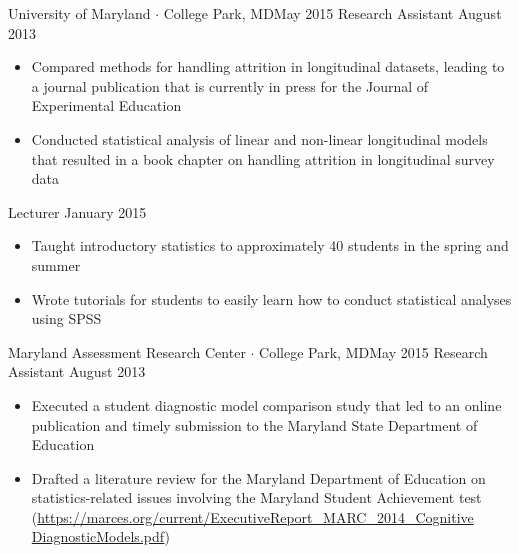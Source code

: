 \begin{experiences}
{\begin{itemize}
      \end{itemize}
                    }

   \emptySeparator
   
 \experience
    {University of Maryland $\cdot$ College Park, MD}{May 2015}
    {Research Assistant}
    {August 2013}    {
       \begin{itemize}
             \item Compared methods for handling attrition in longitudinal datasets, leading to a journal publication that is currently in press for the Journal of Experimental Education   
             
             \item Conducted statistical analysis of linear and non-linear longitudinal models that resulted in a book chapter on handling attrition in longitudinal survey data       
       \end{itemize}
                    }
  \emptySeparator  
  
  {Lecturer}
  {January 2015}{
       \begin{itemize}
             \item Taught introductory statistics to approximately 40 students in the spring and summer
             \item Wrote tutorials for students to easily learn how to conduct statistical analyses using SPSS
      \end{itemize}
  }
\emptySeparator 
 \experience
    {Maryland Assessment Research Center $\cdot$ College Park, MD}{May 2015}
    {Research Assistant}
    {August 2013}    {
       \begin{itemize}
             \item Executed a student diagnostic model comparison study that led to an online publication and timely submission to the Maryland State Department of Education %
             \item Drafted a literature review for the Maryland Department of Education on statistics-related issues involving the Maryland Student Achievement test (\url{https://marces.org/current/ExecutiveReport\_MARC\_2014\_Cognitive DiagnosticModels.pdf})
       \end{itemize}
                    }


\end{experiences}
